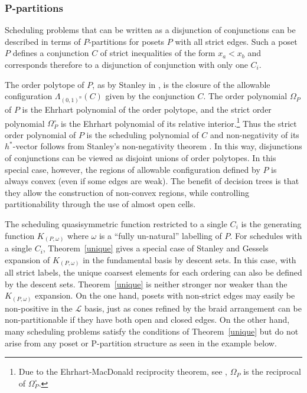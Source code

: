 \documentclass[12pt,reqno]{amsart}
\numberwithin{definition}{section}
\theoremstyle{definition}
\newcommand{\ncL}{\mathcal{L}}
\newcommand{\allow}{\Lambda} %
\newcommand{\allowC}{\allow_{(0,1)^n}} %
\begin{document}
\subsubsection{P-partitions} 

Scheduling problems that can be written as a disjunction of conjunctions  can be
described in terms of $P$-partitions for posets $P$ with all strict
edges.  Such a poset $P$ defines a conjunction $C$ of strict inequalities of the form $x_a<x_b$ and corresponds therefore to a disjunction of conjunction with only one $C_i$.

The order polytope of $P$, as by Stanley in \cite{StanleyOrderPolytopes}, is the closure of the allowable configuration $\allowC(C)$ given by the conjunction $C$. The order polynomial $\Omega_P$ of $P$ is the Ehrhart polynomial of the order polytope, and the strict order polynomial $\Omega^\circ_P$ is the Ehrhart polynomial of its relative interior.\footnote{Due to the Ehrhart-MacDonald reciprocity theorem, see \cite[Chapter~4]{Beck2007}, $\Omega_P$ is the reciprocal of $\Omega^\circ_P$.}  Thus the strict order polynomial of $P$ is the scheduling polynomial of $C$ and non-negativity of its $h^*$-vector follows from Stanley's non-negativity theorem \cite{StanleyDecomp}. In this way, disjunctions of conjunctions can be viewed as disjoint unions of order polytopes. In this special case, however, the regions of allowable configuration defined by $P$ is always convex (even if some edges are weak). The benefit of decision trees is that they allow the construction of non-convex regions, while controlling partitionability through the use of almost open cells.

The scheduling quasisymmetric function
 restricted to a single $C_{i}$ is the generating function
$K_{(P,\omega)}$ where $\omega$ is a ``fully un-natural'' labelling of
$P$. For schedules with a single $C_{i}$, Theorem~\ref{unique}
gives a special case of Stanley and Gessels~\cite{Gessel,StanP} 
expansion of $K_{(P,\omega)}$ in the fundamental basis by descent
sets.  In this case, with all strict labels, the unique coarsest
elements for each ordering can also be defined by the descent sets.
Theorem~\ref{unique} is neither  stronger nor weaker than the
$K_{(P,\omega)}$ expansion.  
On the one hand, posets with non-strict edges may easily be non-positive in the $\ncL$ basis, just as cones refined by the braid arrangement can be non-partitionable if they have both open and closed edges. 
On the other hand, many scheduling problems satisfy the conditions of Theorem~\ref{unique} but do not arise from any poset or P-partition structure as seen in the example below.
\end{document}
